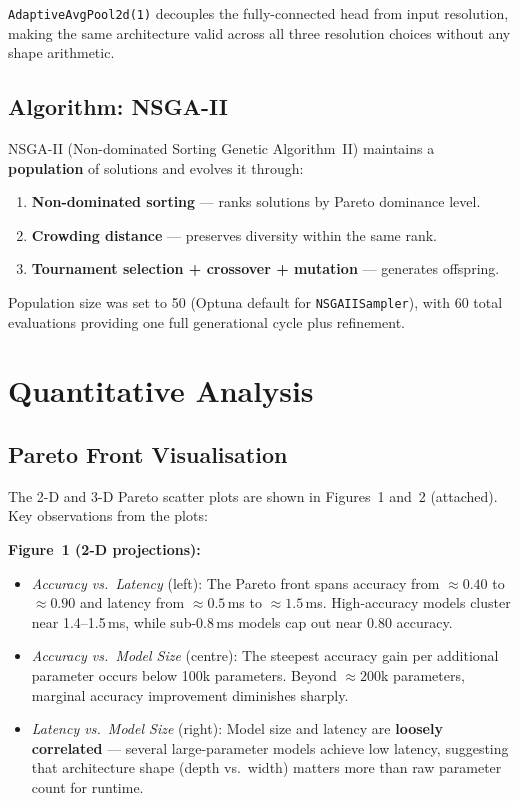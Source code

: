 \documentclass[12pt,a4paper]{article}
\begin{document}
\texttt{AdaptiveAvgPool2d(1)} decouples the fully-connected head from input resolution, making the same architecture valid across all three resolution choices without any shape arithmetic.

\subsection{Algorithm: NSGA-II}
NSGA-II (Non-dominated Sorting Genetic Algorithm~II) maintains a \textbf{population} of solutions and evolves it through:
\begin{enumerate}[leftmargin=2em]
    \item \textbf{Non-dominated sorting} --- ranks solutions by Pareto dominance level.
    \item \textbf{Crowding distance} --- preserves diversity within the same rank.
    \item \textbf{Tournament selection + crossover + mutation} --- generates offspring.
\end{enumerate}

Population size was set to 50 (Optuna default for \texttt{NSGAIISampler}), with 60 total evaluations providing one full generational cycle plus refinement.

\section{Quantitative Analysis}

\subsection{Pareto Front Visualisation}

The 2-D and 3-D Pareto scatter plots are shown in Figures~1 and~2 (attached). Key observations from the plots:

\textbf{Figure~1 (2-D projections):}
\begin{itemize}
    \item \emph{Accuracy vs.\ Latency} (left): The Pareto front spans accuracy from $\approx 0.40$ to $\approx 0.90$ and latency from $\approx 0.5$\,ms to $\approx 1.5$\,ms. High-accuracy models cluster near 1.4--1.5\,ms, while sub-0.8\,ms models cap out near 0.80 accuracy.
    \item \emph{Accuracy vs.\ Model Size} (centre): The steepest accuracy gain per additional parameter occurs below 100k parameters. Beyond $\approx 200$k parameters, marginal accuracy improvement diminishes sharply.
    \item \emph{Latency vs.\ Model Size} (right): Model size and latency are \textbf{loosely correlated} --- several large-parameter models achieve low latency, suggesting that architecture shape (depth vs.\ width) matters more than raw parameter count for runtime.
\end{itemize}
\end{document}

